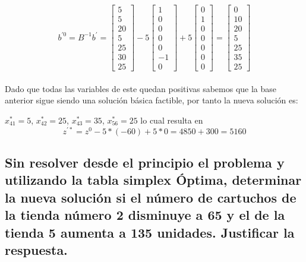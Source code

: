 \documentclass[10pt, a4paper]{article}
\begin{document}
			\[
			b^{'0} = B^{-1}b^{'} =
			\begin{bmatrix}
			    5 \\
			    5 \\
				20 \\
				5 \\
				25 \\
				30 \\
				25
			\end{bmatrix}
			-5
			\begin{bmatrix}
			    1 \\
			    0 \\
				0 \\
				0 \\
				0 \\
				-1 \\
				0
			\end{bmatrix}
			+5
			\begin{bmatrix}
			    0 \\
			    1 \\
				0 \\
				0 \\
				0 \\
				0 \\
				0
			\end{bmatrix}
			=
			\begin{bmatrix}
			    0 \\
			    10 \\
				20 \\
				5 \\
				25 \\
				35 \\
				25
			\end{bmatrix}
			\]

			\paragraph{}
			Dado que todas las variables de este quedan positivas sabemos que la base anterior sigue siendo una solución básica factible, por tanto la nueva solución es:

			\(x_{41}^{*} = 5 \), \(x_{42}^{*} = 25 \), \(x_{43}^{*} = 35 \), \(x_{56}^{*} = 25 \) lo cual resulta en \[
				z^{'*} = z^{0} -5 *(-60) + 5*0 = 4850 + 300 = 5160
			\]

		\subsection{Sin resolver desde el principio el problema y utilizando la tabla simplex Óptima, determinar la nueva solución si el número de cartuchos de la tienda número 2 disminuye a 65 y el de la tienda 5 aumenta a 135 unidades. Justificar la respuesta.}
\end{document}
